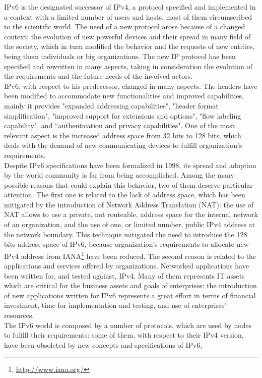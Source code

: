 \documentclass[12pt]{article}
\begin{document}
IPv6 is the designated successor of IPv4, a protocol specified and implemented in a context with a limited number of users and hosts, most of them circumscribed to the scientific world. The need of a new protocol arose 
because of a changed context: the evolution of new powerful devices and their spread in many field of the society, which in turn modified the behavior and the requests of new entities, being them individuals or big 
organizations. The new IP protocol has been specified and rewritten in many aspects, taking in consideration the evolution of the requirements and the future needs of the involved actors.\\
IPv6\cite{rfc2460}, with respect to his predecessor, changed in many aspects. The headers have been modified to accommodate new functionalities and improved capabilities, mainly it provides "expanded addressing 
capabilities", "header format simplification", "improved support for extensions and options", "flow labeling capability", and ``authentication and privacy capabilities". One of the most relevant aspect is the increased 
address space from 32 bits to 128 bits, which deals with the demand of new communicating devices to fulfill organization's requirements.\\
Despite IPv6 specifications have been formalized in 1998, its spread and adoption by the world community is far from being accomplished. Among the many possible reasons that could explain this behavior, two of them 
deserve particular attention. The first one is related to the lack of address space, which has been mitigated by the introduction of Network Address Translation (NAT)\cite{rfc3022}: the use of NAT allows to use a private, not routeable,
address space for the internal network of an organization, and the use of one, or limited number, public IPv4 address at the network boundary. This technique mitigated the need to introduce the 128 bits address space 
of IPv6, because organization's requirements to allocate new IPv4 address from IANA\footnote{\url{http://www.iana.org/}} have been reduced. The second reason is related to the applications and services offered by organizations. Networked 
applications have been written for, and tested against, IPv4. Many of them represents IT assets which are critical for the business assets and goals of enterprises: the introduction of new applications written for IPv6 
represents a great effort in terms of financial investment, time for implementation and testing, and use of enterprises' resources.\\
The IPv6 world is composed by a number of protocols, which are used by nodes to fulfill their requirements: some of them, with respect to their IPv4 version, have been obsoleted by new concepts and specifications of IPv6, 
\end{document}

